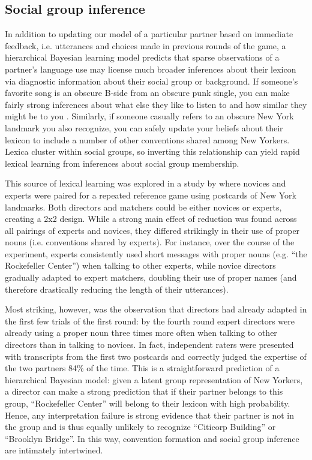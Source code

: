 \documentclass[11pt, floatsintext, jou]{apa6}
\begin{document}
\subsection{Social group inference}

In addition to updating our model of a particular partner based on immediate feedback, i.e. utterances and choices made in previous rounds of the game, a hierarchical Bayesian learning model predicts that sparse observations of a partner's language use may license much broader inferences about their lexicon via diagnostic information about their social group or background. If someone's favorite song is an obscure B-side from an obscure punk single, you can make fairly strong inferences about what else they like to listen to and how similar they might be to you \cite{VelezEtAl16_Overlaps, GershmanEtAl17_StructureSocialInfluence}. Similarly, if someone casually refers to an obscure New York landmark you also recognize, you can safely update your beliefs about their lexicon to include a number of other conventions shared among New Yorkers. Lexica cluster within social groups, so inverting this relationship can yield rapid lexical learning from inferences about social group membership.

This source of lexical learning was explored in a study by  where novices and experts were paired for a repeated reference game using postcards of New York landmarks. Both directors and matchers could be either novices or experts, creating a 2x2 design. While a strong main effect of reduction was found across all pairings of experts and novices, they differed strikingly in their use of proper nouns (i.e. conventions shared by experts). For instance, over the course of the experiment, experts consistently used short messages with proper nouns (e.g. ``the Rockefeller Center'') when talking to other experts, while novice directors gradually adapted to expert matchers, doubling their use of proper names (and therefore drastically reducing the length of their utterances).

Most striking, however, was the observation that directors had already adapted in the first few trials of the first round: by the fourth round expert directors were already using a proper noun three times more often when talking to other directors than in talking to novices. In fact, independent raters were presented with transcripts from the first two postcards and correctly judged the expertise of the two partners 84\% of the time. This is a straightforward prediction of a hierarchical Bayesian model: given a latent group representation of New Yorkers, a director can make a strong prediction that if their partner belongs to this group, ``Rockefeller Center'' will belong to their lexicon with high probability. Hence, any interpretation failure is strong evidence that their partner is not in the group and is thus equally unlikely to recognize ``Citicorp Building'' or ``Brooklyn Bridge''. In this way, convention formation and social group inference are intimately intertwined. 
\end{document}

